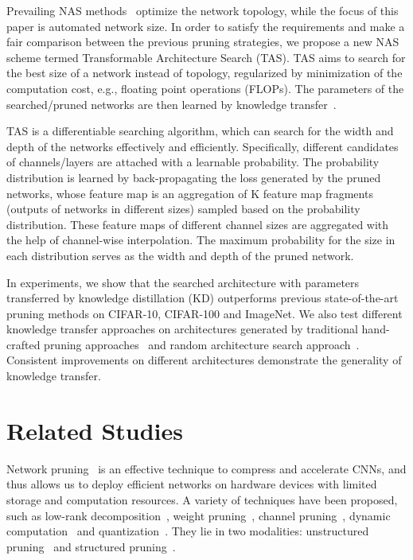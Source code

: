 \documentclass{article}
\def\NAME{{TAS}}
\begin{document}
Prevailing NAS methods~\cite{liu2019darts,zoph2017neural,dong2019search,cai2018proxylessnas,real2019regularized} optimize the network topology, while the focus of this paper is automated network size.
In order to satisfy the requirements and make a fair comparison between the previous pruning strategies, we propose a new NAS scheme termed Transformable Architecture Search ({\NAME}).
{\NAME} aims to search for the best size of a network instead of topology, regularized by minimization of the computation cost, e.g., floating point operations (FLOPs).
The parameters of the searched/pruned networks are then learned by knowledge transfer~\cite{hinton2014distilling,yim2017gift,zagoruyko2017paying}.


{\NAME} is a differentiable searching algorithm, which can search for the width and depth of the networks effectively and efficiently. Specifically, different candidates of channels/layers are attached with a learnable probability. The probability distribution is learned by back-propagating the loss generated by the pruned networks, whose feature map is an aggregation of K feature map fragments (outputs of networks in different sizes) sampled based on the probability distribution.
These feature maps of different channel sizes are aggregated with the help of channel-wise interpolation.
The maximum probability for the size in each distribution serves as the width and depth of the pruned network.


In experiments, we show that the searched architecture with parameters transferred by knowledge distillation (KD) outperforms previous state-of-the-art pruning methods on CIFAR-10, CIFAR-100 and ImageNet.
We also test different knowledge transfer approaches on architectures generated by traditional hand-crafted pruning approaches~\cite{li2017pruning,he2018soft} and random architecture search approach~\cite{liu2019darts}.
Consistent improvements on different architectures demonstrate the generality of knowledge transfer.






\section{Related Studies}\label{sec:relate}

Network pruning~\cite{lecun1990optimal,liu2019rethinking} is an effective technique to compress and accelerate CNNs, and thus allows us to deploy efficient networks on hardware devices with limited storage and computation resources.
A variety of techniques have been proposed, such as low-rank decomposition~\cite{zhang2016accelerating}, weight pruning~\cite{hassibi1993second,lecun1990optimal,han2016learning,han2016deep}, channel pruning~\cite{he2018soft,liu2019rethinking}, dynamic computation~\cite{figurnov2017spatially,dong2017more} and quantization~\cite{hubara2017quantized,alizadeh2019empirical}.
They lie in two modalities: unstructured pruning~\cite{lecun1990optimal,figurnov2017spatially,dong2017more,han2016deep} and structured pruning~\cite{li2017pruning,he2017channel,he2018soft,liu2019rethinking}.
\end{document}
